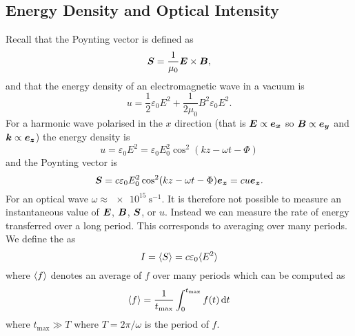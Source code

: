     \subsection{Energy Density and Optical Intensity}
    Recall that the Poynting vector is defined as
    \[\bm{S} = \frac{1}{\mu_0}\bm{E}\times\bm{B},\]
    and that the energy density of an electromagnetic wave in a vacuum is
    \[u = \frac{1}{2}\varepsilon_0E^2 + \frac{1}{2\mu_0}B^2 \varepsilon_0E^2.\]
    For a harmonic wave polarised in the \(x\) direction (that is \(\bm{E}\propto\bm{e_{x}}\) so \(\bm{B}\propto\bm{e_{y}}\) and \(\bm{k}\propto\bm{e_{z}}\)) the energy density is
    \[u = \varepsilon_0E^2 = \varepsilon_0 E_0^2\cos^2(kz - \omega t - \Phi)\]
    and the Poynting vector is
    \[\bm{S} = c\varepsilon_0E_0^2\cos^2(kz - \omega t - \Phi)\bm{e_{z}} = cu\bm{e_{z}}.\]
    For an optical wave \(\omega \approx \SI{e15}{\second^{-1}}\).
    It is therefore not possible to measure an instantaneous value of \(\bm{E}\), \(\bm{B}\), \(\bm{S}\), or \(u\).
    Instead we can measure the rate of energy transferred over a long period.
    This corresponds to averaging over many periods.
    We define the  as
    \[I = \langle{S}\rangle = c\varepsilon_0\langle{E^2}\rangle\]
    where \(\langle{f}\rangle\) denotes an average of \(f\) over many periods which can be computed as
    \[\langle{f}\rangle = \frac{1}{t_{\max}} \int_0^{t_{\max}}f(t)\dd{t}\]
    where \(t_{\max}\gg T\) where \(T = 2\pi/\omega\) is the period of \(f\).
    
